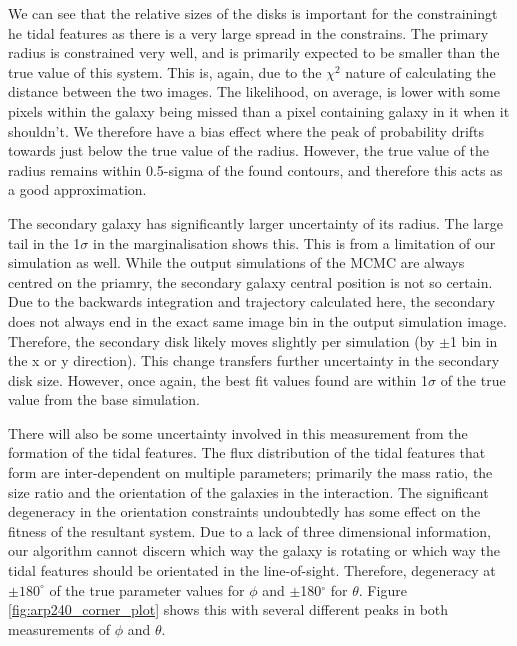 We can see that the relative sizes of the disks is important for the constrainingt he tidal features as there is a very large spread in the constrains. The primary radius is constrained very well, and is primarily expected to be smaller than the true value of this system. This is, again, due to the $\chi^{2}$ nature of calculating the distance between the two images. The likelihood, on average, is lower with some pixels within the galaxy being missed than a pixel containing galaxy in it when it shouldn't. We therefore have a bias effect where the peak of probability drifts towards just below the true value of the radius. However, the true value of the radius remains within 0.5-sigma of the found contours, and therefore this acts as a good approximation. 

The secondary galaxy has significantly larger uncertainty of its radius. The large tail in the 1$\sigma$ in the marginalisation shows this. This is from a limitation of our simulation as well. While the output simulations of the MCMC are always centred on the priamry, the secondary galaxy central position is not so certain. Due to the backwards integration and trajectory calculated here, the secondary does not always end in the exact same image bin in the output simulation image. Therefore, the secondary disk likely moves slightly per simulation (by $\pm$1 bin in the x or y direction). This change transfers further uncertainty in the secondary disk size. However, once again, the best fit values found are within 1$\sigma$ of the true value from the base simulation. 

There will also be some uncertainty involved in this measurement from the formation of the tidal features. The flux distribution of the tidal features that form are inter-dependent on multiple parameters; primarily the mass ratio, the size ratio and the orientation of the galaxies in the interaction. The significant degeneracy in the orientation constraints undoubtedly has some effect on the fitness of the resultant system. Due to a lack of three dimensional information, our algorithm cannot discern which way the galaxy is rotating or which way the tidal features should be orientated in the line-of-sight. Therefore, degeneracy at $\pm180^{\circ}$ of the true parameter values for $\phi$ and $\pm$180$^{\circ}$ for $\theta$. Figure \ref{fig:arp240_corner_plot} shows this with several different peaks in both measurements of $\phi$ and $\theta$.

